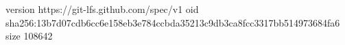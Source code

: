 version https://git-lfs.github.com/spec/v1
oid sha256:13b7d07cdb6cc6e158eb3e784ccbda35213c9db3ca8fcc3317bb514973684fa6
size 108642
